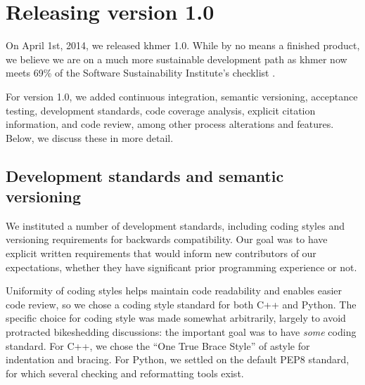 \documentclass[12pt]{article}
\begin{document}

\section{Releasing version 1.0}

On April 1st, 2014, we released khmer 1.0.  While by no means a finished
product, we believe we are on a much more sustainable development path as khmer
now meets 69\% of the Software Sustainability Institute's checklist
\cite{khmer-1.0-assessment}.

For version 1.0, we added continuous integration, semantic versioning,
acceptance testing, development standards, code coverage analysis,
explicit citation information, and code review, among other process
alterations and features.  Below, we discuss these in more detail.

\subsection{Development standards and semantic versioning}

We instituted a number of development standards, including coding
styles and versioning requirements for backwards compatibility.  Our
goal was to have explicit written requirements that would inform new
contributors of our expectations, whether they have significant prior
programming experience or not.

Uniformity of coding styles helps maintain code readability and
enables easier code review, so we chose a coding style standard for
both C++ and Python.  The specific choice for coding style was made
somewhat arbitrarily, largely to avoid protracted bikeshedding
discussions: the important goal was to have {\em some} coding
standard.  For C++, we chose the ``One True Brace Style'' of astyle
for indentation and bracing.  For Python, we settled on the default
PEP8 standard, for which several checking and reformatting tools
exist.
\end{document}
